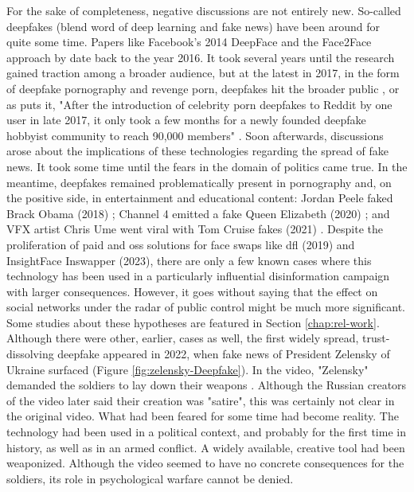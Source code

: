 \documentclass[
  a4paper,  %
  twoside,  %
  bibliography=totoc,
  headsepline,
  cleardoublepage=empty,
  parskip=half,
  draft=false
]{scrbook}
\begin{document}
For the sake of completeness, negative discussions are not entirely new. So-called deepfakes (blend word of deep learning and fake news) have been around for quite some time. Papers like Facebook's 2014 DeepFace \cite{taigmanDeepFaceClosingGap2014} and the Face2Face approach by \citet{thiesFace2FaceRealtimeFace2020} date back to the year 2016. It took several years until the research gained traction among a broader audience, but at the latest in 2017, in the form of deepfake pornography and revenge porn, deepfakes hit the broader public \cite{coleAIAssistedFakePorn2017}, or as \citeauthor{westerlundEmergenceDeepfakeTechnology2019a} puts it, "After the introduction of celebrity porn deepfakes to Reddit by one user in late 2017, it only took a few months for a newly founded deepfake hobbyist community to reach 90,000 members" \cite[p. 41]{westerlundEmergenceDeepfakeTechnology2019a}. Soon afterwards, discussions arose about the implications of these technologies regarding the spread of fake news. It took some time until the fears in the domain of politics came true. In the meantime, deepfakes remained problematically present in pornography and, on the positive side, in entertainment and educational content: Jordan Peele faked Brack Obama (2018) \cite{vincentWatchJordanPeele2018}; Channel 4 emitted a fake Queen Elizabeth (2020) \cite{bbcnewsDeepfakeQueenDeliver2020}; and VFX artist Chris Ume went viral with Tom Cruise fakes (2021) \cite{vincentTomCruiseDeepfake2021}. Despite the proliferation of paid and \gls{oss} solutions for face swaps like \gls{dfl} (2019) and InsightFace Inswapper (2023), there are only a few known cases where this technology has been used in a particularly influential disinformation campaign with larger consequences. However, it goes without saying that the effect on social networks under the radar of public control might be much more significant. Some studies about these hypotheses are featured in Section \ref{chap:rel-work}. \\
Although there were other, earlier, cases as well, the first widely spread, trust-dissolving deepfake appeared in 2022, when fake news of President Zelensky of Ukraine surfaced (Figure \ref{fig:zelensky-Deepfake}). In the video, "Zelensky" demanded the soldiers to lay down their weapons \cite{zdfPropagandaImKrieg2022}. Although the Russian creators of the video later said their creation was "satire", this was certainly not clear in the original video. What had been feared for some time had become reality. The technology had been used in a political context, and probably for the first time in history, as well as in an armed conflict. A widely available, creative tool had been weaponized. Although the video seemed to have no concrete consequences for the soldiers, its role in psychological warfare cannot be denied.
\end{document}
